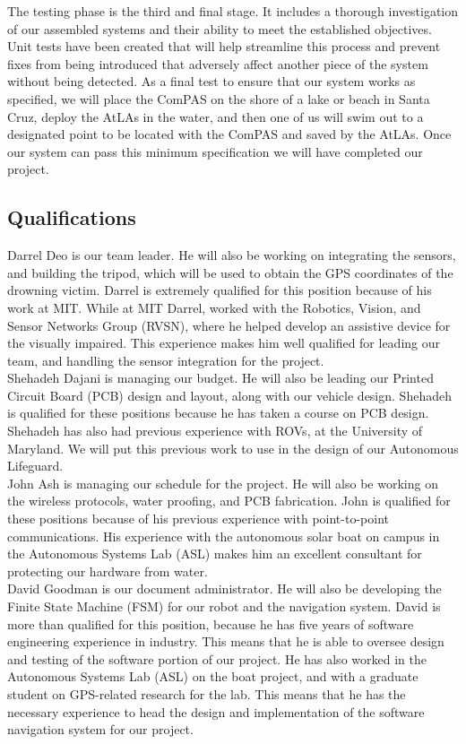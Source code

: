 \documentclass[11pt]{article}
\begin{document}
The testing phase is the third and final stage. It includes a thorough investigation of our assembled systems and their ability to meet the established objectives. Unit tests have been created that will help streamline this process and prevent fixes from being introduced that adversely affect another piece of the system without being detected.  As a final test to ensure that our system works as specified, we will place the ComPAS on the shore of a lake or beach in Santa Cruz, deploy the AtLAs in the water, and then one of us will swim out to a designated point to be located with the ComPAS and saved by the AtLAs. Once our system can pass this minimum specification we will have completed our project.

\subsection*{Qualifications}

Darrel Deo is our team leader. He will also be working on integrating the sensors, and building the tripod, which will be used to obtain the GPS coordinates of the drowning victim. Darrel is extremely qualified for this position because of his work at MIT. While at MIT Darrel, worked with the Robotics, Vision, and Sensor Networks Group (RVSN),  where he helped develop an assistive device for the visually impaired. This experience makes him well qualified for leading our team, and handling the sensor integration for the project.\\

Shehadeh Dajani is managing our budget. He will also be leading our Printed Circuit Board (PCB) design and layout, along with our vehicle design. Shehadeh is qualified for these positions because he has taken a course on PCB design. Shehadeh has also had previous experience with ROVs, at the University of Maryland. We will put this previous work to use in the design of our Autonomous Lifeguard.\\

John Ash is managing our schedule for the project. He will also be working on the wireless protocols, water proofing, and PCB fabrication. John is qualified for these positions because of his previous experience with point-to-point communications. His experience with the autonomous solar boat on campus in the Autonomous Systems Lab (ASL) makes him an excellent consultant for protecting our hardware from water. \\

David Goodman is our document administrator. He will also be developing the Finite State Machine (FSM) for our robot and the navigation system. David is more than qualified for this position, because he has five years of software engineering experience in industry. This means that he is able to oversee design and testing of the software portion of our project. He has also worked in the Autonomous Systems Lab (ASL) on the boat project, and with a graduate student on GPS-related research for the lab. This means that he has the necessary experience to head the design and implementation of the software  navigation system for our project. 
\end{document}
